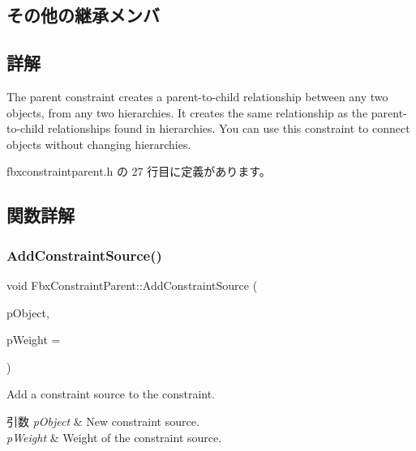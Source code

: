\subsection*{その他の継承メンバ}


\subsection{詳解}
The parent constraint creates a parent-\/to-\/child relationship between any two objects, from any two hierarchies. It creates the same relationship as the parent-\/to-\/child relationships found in hierarchies. You can use this constraint to connect objects without changing hierarchies. 

 fbxconstraintparent.\+h の 27 行目に定義があります。



\subsection{関数詳解}
\mbox{\label{class_fbx_constraint_parent_af1cb13c89d62f1de2478a5a102fd5788}} 
\subsubsection{\texorpdfstring{Add\+Constraint\+Source()}{AddConstraintSource()}}
{\footnotesize\ttfamily void Fbx\+Constraint\+Parent\+::\+Add\+Constraint\+Source (\begin{DoxyParamCaption}\item[{\hyperlink{class_fbx_object}{Fbx\+Object} $\ast$}]{p\+Object,  }\item[{double}]{p\+Weight = {} }\end{DoxyParamCaption})}

Add a constraint source to the constraint. 
\begin{DoxyParams}{引数}
{\em p\+Object} & New constraint source. \\
\hline
{\em p\+Weight} & Weight of the constraint source. \\
\hline
\end{DoxyParams}
\mbox{\label{class_fbx_constraint_parent_af968ae8a08629c4c259ec70ce2697c0e}} 
